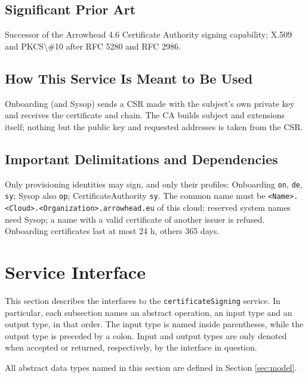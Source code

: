 \documentclass[a4paper]{arrowhead}
\begin{document}
\subsection{Significant Prior Art}

Successor of the Arrowhead 4.6 Certificate Authority signing capability; X.509 and PKCS\textbackslash{}\#10 after RFC 5280 and RFC 2986.

\subsection{How This Service Is Meant to Be Used}

Onboarding (and Sysop) sends a CSR made with the subject's own private key and receives the certificate and chain. The CA builds subject and extensions itself; nothing but the public key and requested addresses is taken from the CSR.

\subsection{Important Delimitations and Dependencies}
\label{sec:delimitations}

Only provisioning identities may sign, and only their profiles: Onboarding \texttt{on}, \texttt{de}, \texttt{sy}; Sysop also \texttt{op}; Certificate\allowbreak{}Authority \texttt{sy}. The common name must be \texttt{\textless{}Name\textgreater{}.\allowbreak{}\textless{}Cloud\textgreater{}.\allowbreak{}\textless{}Organization\textgreater{}.\allowbreak{}arrowhead.\allowbreak{}eu} of this cloud; reserved system names need Sysop; a name with a valid certificate of another issuer is refused. Onboarding certificates last at most 24 h, others 365 days.

\newpage

\section{Service Interface}
\label{sec:operations}

This section describes the interfaces to the \texttt{certificateSigning} service.
In particular, each subsection names an abstract operation, an input type and an output type, in that order.
The input type is named inside parentheses, while the output type is preceded by a colon.
Input and output types are only denoted when accepted or returned, respectively, by the interface in question.

All abstract data types named in this section are defined in Section \ref{sec:model}.
\end{document}
